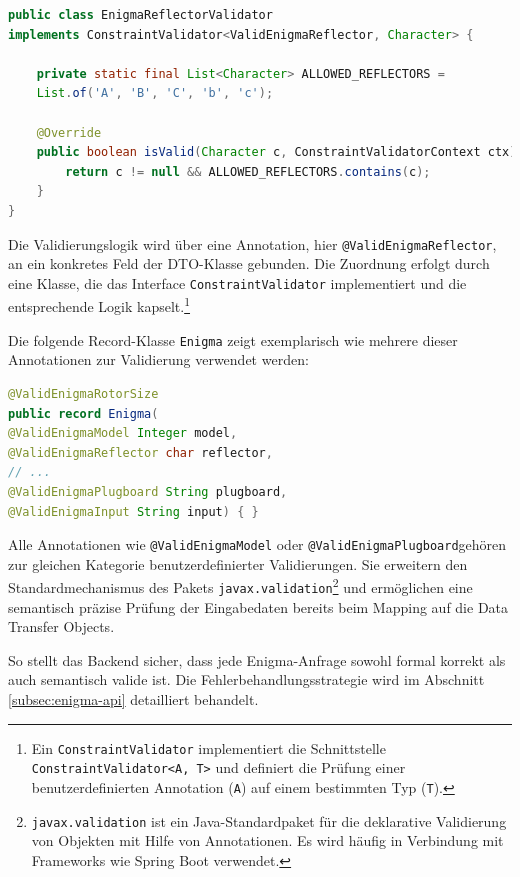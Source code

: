 \documentclass[12pt, ngerman, a4paper, numbers=noenddot]{article}
\begin{document}
\begin{lstlisting}[language=Java, caption={Validierung zulässiger Umkehrwalzen}, label=lst:reflector-validator]
public class EnigmaReflectorValidator 
implements ConstraintValidator<ValidEnigmaReflector, Character> {
	
	private static final List<Character> ALLOWED_REFLECTORS = 
	List.of('A', 'B', 'C', 'b', 'c');
	
	@Override
	public boolean isValid(Character c, ConstraintValidatorContext ctx) {
		return c != null && ALLOWED_REFLECTORS.contains(c);
	}
}
\end{lstlisting}
Die Validierungslogik wird über eine Annotation, hier \lstinline|@ValidEnigmaReflector|, an ein konkretes Feld der DTO-Klasse gebunden. Die Zuordnung erfolgt durch eine Klasse, die das Interface \lstinline|ConstraintValidator| implementiert und die entsprechende Logik kapselt.\footnote{%
	Ein \lstinline|ConstraintValidator| implementiert die Schnittstelle \newline\lstinline|ConstraintValidator<A, T>| und definiert die Prüfung einer benutzerdefinierten Annotation (\lstinline|A|) auf einem bestimmten Typ (\lstinline|T|).%
}


\newpage
Die folgende Record-Klasse \lstinline|Enigma| zeigt exemplarisch wie mehrere dieser Annotationen zur Validierung verwendet werden:

\begin{lstlisting}[language=Java, caption={DTO-Klasse \lstinline|Enigma| mit Validierungsannotationen}, label=lst:enigma-dto]
@ValidEnigmaRotorSize
public record Enigma(
@ValidEnigmaModel Integer model,
@ValidEnigmaReflector char reflector,
// ...
@ValidEnigmaPlugboard String plugboard,
@ValidEnigmaInput String input) { }
\end{lstlisting}

Alle Annotationen wie \lstinline|@ValidEnigmaModel| oder \lstinline|@ValidEnigmaPlugboard|\newline gehören zur gleichen Kategorie benutzerdefinierter Validierungen. Sie erweitern den Standardmechanismus des Pakets \lstinline|javax.validation|\footnote{%
	\lstinline|javax.validation| ist ein Java-Standardpaket für die deklarative Validierung von Objekten mit Hilfe von Annotationen. Es wird häufig in Verbindung mit Frameworks wie Spring Boot verwendet.%
}
 und ermöglichen eine semantisch präzise Prüfung der Eingabedaten bereits beim Mapping auf die Data Transfer Objects.

So stellt das Backend sicher, dass jede Enigma-Anfrage sowohl formal korrekt als auch semantisch valide ist. Die Fehlerbehandlungsstrategie wird im Abschnitt \ref{subsec:enigma-api} detailliert behandelt.
\end{document}
